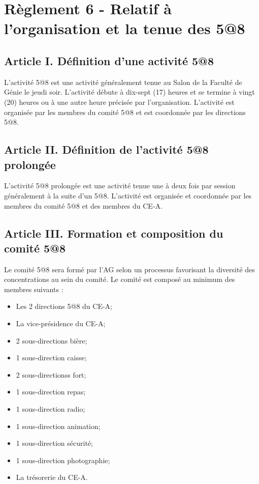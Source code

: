 
\section*{Règlement 6 - Relatif à l'organisation et la tenue des 5@8} 


\subsection*{Article I. Définition d'une activité 5@8}
L’activité 5@8 est une activité généralement tenue au Salon de la Faculté de Génie le jeudi soir. L’activité débute à dix-sept (17) heures et se termine à vingt (20) heures ou à une autre heure précisée par l’organisation. L’activité est organisée par les membres du comité 5@8 et est coordonnée par les directions 5@8.

\subsection*{Article II. Définition de l'activité 5@8 prolongée}
L’activité 5@8 prolongée est une activité tenue une à deux fois par session généralement à la suite d’un 5@8. L’activité est organisée et coordonnée par les membres du comité 5@8 et des membres du CE-A. 

\subsection*{Article III. Formation et composition du comité 5@8}
Le comité 5@8 sera formé par l’AG selon un processus favorisant la diversité des concentrations au sein du comité. Le comité est composé au minimum des membres suivants :
\begin{itemize}
\item Les 2 directions 5@8 du CE-A;
\item La vice-présidence du CE-A;
\item 2 sous-directions bière;
\item 1 sous-direction caisse;
\item 2 sous-directionss fort;
\item 1 sous-direction repas; 
\item 1 sous-direction radio;
\item 1 sous-direction animation;
\item 1 sous-direction sécurité;
\item 1 sous-direction photographie;
\item La trésorerie du CE-A.
\end{itemize}

